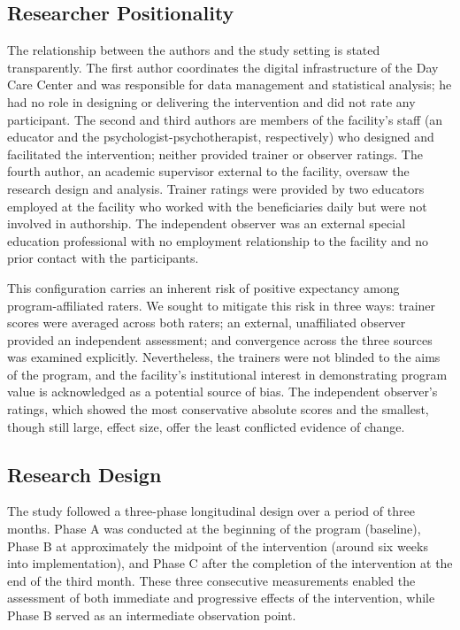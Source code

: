 \documentclass[12pt,a4paper]{article}
\begin{document}
\subsection{Researcher Positionality}

The relationship between the authors and the study setting is stated transparently. The first author coordinates the digital infrastructure of the Day Care Center and was responsible for data management and statistical analysis; he had no role in designing or delivering the intervention and did not rate any participant. The second and third authors are members of the facility's staff (an educator and the psychologist-psychotherapist, respectively) who designed and facilitated the intervention; neither provided trainer or observer ratings. The fourth author, an academic supervisor external to the facility, oversaw the research design and analysis. Trainer ratings were provided by two educators employed at the facility who worked with the beneficiaries daily but were not involved in authorship. The independent observer was an external special education professional with no employment relationship to the facility and no prior contact with the participants.

This configuration carries an inherent risk of positive expectancy among program-affiliated raters. We sought to mitigate this risk in three ways: trainer scores were averaged across both raters; an external, unaffiliated observer provided an independent assessment; and convergence across the three sources was examined explicitly. Nevertheless, the trainers were not blinded to the aims of the program, and the facility's institutional interest in demonstrating program value is acknowledged as a potential source of bias. The independent observer's ratings, which showed the most conservative absolute scores and the smallest, though still large, effect size, offer the least conflicted evidence of change.

\subsection{Research Design}

The study followed a three-phase longitudinal design over a period of three months. Phase A was conducted at the beginning of the program (baseline), Phase B at approximately the midpoint of the intervention (around six weeks into implementation), and Phase C after the completion of the intervention at the end of the third month. These three consecutive measurements enabled the assessment of both immediate and progressive effects of the intervention, while Phase B served as an intermediate observation point.
\end{document}
